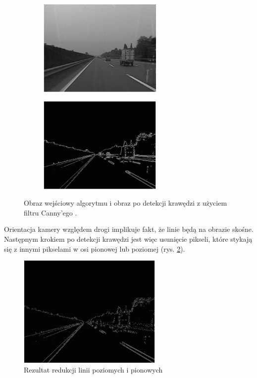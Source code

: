 \begin{figure}[h]
	\centering
	\begin{subfigure}{0.35\textwidth}
		\centering
		\includegraphics[width=6cm]{img/lane_detection2_input.png}
		\subcaption{\label{fig:lane_detection2_input}}
	\end{subfigure}
	\begin{subfigure}{0.35\textwidth}
		\centering
		\includegraphics[width=6cm]{img/lane_detection2_canny.png}
		\subcaption{\label{fig:lane_detection2_canny}}
	\end{subfigure}
	
	\caption{\label{fig:details}Obraz wejściowy algorytmu \protect{} i obraz po detekcji krawędzi z użyciem filtru Canny'ego \protect{}.\cite{T6}}
\end{figure}

Orientacja kamery względem drogi implikuje fakt, że linie będą na obrazie skośne. Następnym krokiem po detekcji krawędzi jest więc usunięcie pikseli, które stykają się z innymi pikselami w osi pionowej lub poziomej (rys. \ref{fig:lane_detection2_noise1}).

\begin{figure}
  \centering
  \includegraphics[width=7cm]{img/lane_detection2_noise1.png}
  \caption{Rezultat redukcji linii poziomych i pionowych\cite{T6}}
  \label{fig:lane_detection2_noise1}
\end{figure}

